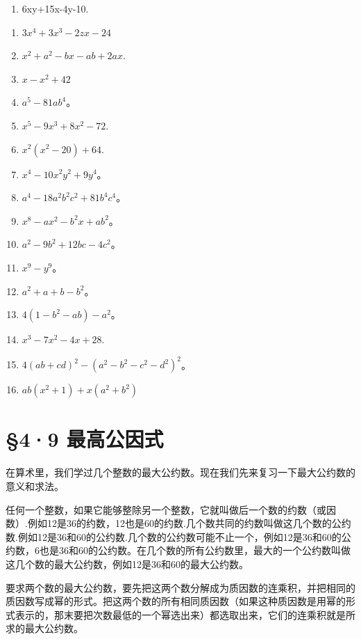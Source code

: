 \begin{enumerate}[start=4]
\item
  6xy+15x-4y-10.
\end{enumerate}

\begin{enumerate}[start=5]
\item
  \(3x^{4}+3x^{3}-2zx-24\)
\item
  \(x^{2}+a^{2}-bx-ab+2ax.\)
\item
  \(x - x^{2} + 42\)
\item
  \(a^5 - 81ab^4\)。
\item
  \(x^{5} - 9x^{3} + 8x^{2} - 72.\)
\item
  \(x^{2}(x^{2} - 20) + 64.\)
\item
  \(x^{4} - 10x^{2}y^{2} + 9y^{4}\)。
\item
  \(a^4 - 18a^2b^2c^2 + 81b^4c^4\)。
\item
  \(x^{8} - ax^{2} - b^{2}x + ab^{2}\)。
\item
  \(a^2 - 9b^2 + 12bc - 4c^2\)。
\item
  \(x^{9} - y^{9}\)。
\item
  \(a^2 + a + b - b^2\)。
\item
  \(4(1 - b^{2} - ab) - a^{2}\)。
\item
  \(x^{3} - 7x^{2} - 4x + 28.\)
\item
  \(4(ab + cd)^{2} - (a^{2} - b^{2} - c^{2} - d^{2})^{2}\)。
\item
  \(ab(x^{2} + 1) + x(a^{2} + b^{2})\)
\end{enumerate}

\section{§4·9 最高公因式}

在算术里，我们学过几个整数的最大公约数。现在我们先来复习一下最大公约数的意义和求法。

任何一个整数，如果它能够整除另一个整数，它就叫做后一个数的约数（或因数）.例如12是36的约数，12也是60的约数.几个数共同的约数叫做这几个数的公约数.例如12是36和60的公约数.几个数的公约数可能不止一个，例如12是36和60的公约数，6也是36和60的公约数。在几个数的所有公约数里，最大的一个公约数叫做这几个数的最大公约数，例如12是36和60的最大公约数。

要求两个数的最大公约数，要先把这两个数分解成为质因数的连乘积，并把相同的质因数写成幂的形式。把这两个数的所有相同质因数（如果这种质因数是用幂的形式表示的，那末要把次数最低的一个幂选出来）都选取出来，它们的连乘积就是所求的最大公约数。

